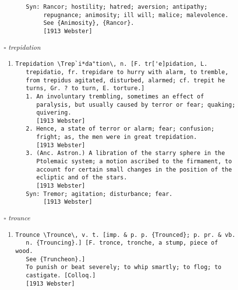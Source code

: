 \documentclass{article}
\begin{document}
\begin{itemize}
\begin{enumerate}
{\begin{lstlisting}
   Syn: Rancor; hostility; hatred; aversion; antipathy;
        repugnance; animosity; ill will; malice; malevolence.
        See {Animosity}, {Rancor}.
        [1913 Webster]
\end{lstlisting}}
\end{enumerate}
\item[$\square$] \emph{ trepidation }
\begin{enumerate}
\item{
\begin{lstlisting}
Trepidation \Trep`i*da"tion\, n. [F. tr['e]pidation, L.
   trepidatio, fr. trepidare to hurry with alarm, to tremble,
   from trepidus agitated, disturbed, alarmed; cf. trepit he
   turns, Gr. ? to turn, E. torture.]
   1. An involuntary trembling, sometimes an effect of
      paralysis, but usually caused by terror or fear; quaking;
      quivering.
      [1913 Webster]
   2. Hence, a state of terror or alarm; fear; confusion;
      fright; as, the men were in great trepidation.
      [1913 Webster]
   3. (Anc. Astron.) A libration of the starry sphere in the
      Ptolemaic system; a motion ascribed to the firmament, to
      account for certain small changes in the position of the
      ecliptic and of the stars.
      [1913 Webster]
   Syn: Tremor; agitation; disturbance; fear.
        [1913 Webster]
\end{lstlisting}}
\end{enumerate}
\item[$\square$] \emph{ trounce }
\begin{enumerate}
\item{
\begin{lstlisting}
Trounce \Trounce\, v. t. [imp. & p. p. {Trounced}; p. pr. & vb.
   n. {Trouncing}.] [F. tronce, tronche, a stump, piece of wood.
   See {Truncheon}.]
   To punish or beat severely; to whip smartly; to flog; to
   castigate. [Colloq.]
   [1913 Webster]
\end{lstlisting}}
\end{enumerate}
\end{itemize}
\end{document}
